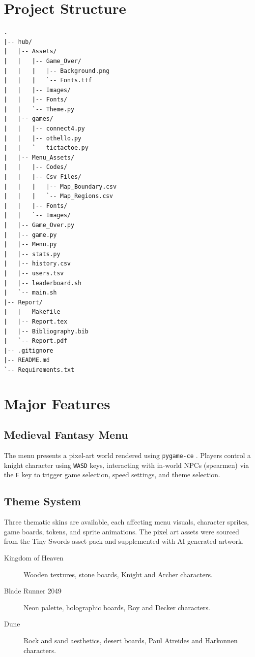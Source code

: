 \documentclass[12pt, a4paper]{article}
\begin{document}
\section{Project Structure}

\begin{verbatim}
.
|-- hub/
|   |-- Assets/
|   |   |-- Game_Over/
|   |   |   |-- Background.png
|   |   |   `-- Fonts.ttf
|   |   |-- Images/
|   |   |-- Fonts/
|   |   `-- Theme.py
|   |-- games/
|   |   |-- connect4.py
|   |   |-- othello.py
|   |   `-- tictactoe.py
|   |-- Menu_Assets/
|   |   |-- Codes/
|   |   |-- Csv_Files/
|   |   |   |-- Map_Boundary.csv
|   |   |   `-- Map_Regions.csv
|   |   |-- Fonts/
|   |   `-- Images/
|   |-- Game_Over.py
|   |-- game.py
|   |-- Menu.py
|   |-- stats.py
|   |-- history.csv
|   |-- users.tsv
|   |-- leaderboard.sh
|   `-- main.sh
|-- Report/
|   |-- Makefile
|   |-- Report.tex
|   |-- Bibliography.bib
|   `-- Report.pdf
|-- .gitignore
|-- README.md
`-- Requirements.txt
\end{verbatim}

\section{Major Features}

\subsection{Medieval Fantasy Menu}

The menu presents a pixel-art world rendered using \texttt{pygame-ce} \cite{pygamece}. Players control a knight character using \texttt{WASD} keys, interacting with in-world NPCs (spearmen) via the \texttt{E} key to trigger game selection, speed settings, and theme selection.

\subsection{Theme System}

Three thematic skins are available, each affecting menu visuals, character sprites, game boards, tokens, and sprite animations. The pixel art assets were sourced from the Tiny Swords asset pack \cite{tinyswords} and supplemented with AI-generated artwork.

\begin{description}
    \item[Kingdom of Heaven] Wooden textures, stone boards, Knight and Archer characters.
    \item[Blade Runner 2049] Neon palette, holographic boards, Roy and Decker characters.
    \item[Dune] Rock and sand aesthetics, desert boards, Paul Atreides and Harkonnen characters.
\end{description}
\end{document}

